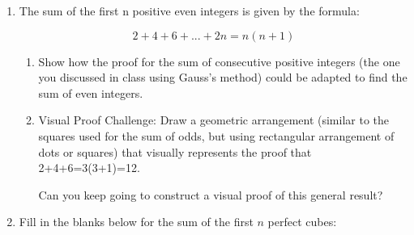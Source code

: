 \documentclass[fleqn]{article}
\theoremstyle{definition}
\begin{document}
\begin{enumerate}

\item The sum of the first n positive even integers is given by the formula:

$$2+4+6+...+2n=n(n+1)$$
    \begin{enumerate}
    \item Show how the proof for the sum of consecutive positive integers (the one you discussed in class using Gauss's method) could be adapted to find the sum of even integers.


\vspace{7cm}
    
    \item Visual Proof Challenge: Draw a geometric arrangement (similar to the squares used for the sum of odds, but using rectangular arrangement of dots or squares) that visually represents the proof that 2+4+6=3(3+1)=12. 
    
    \vspace{.25cm} 
    Can you keep going to construct a visual proof of this general result? 
    
    \end{enumerate}

\vspace{3cm}
\item Fill in the blanks below for the sum of the first $n$ perfect cubes:

\vspace{.25cm}
\begin{enumerate}
\end{enumerate}
\end{enumerate}
\end{document}
